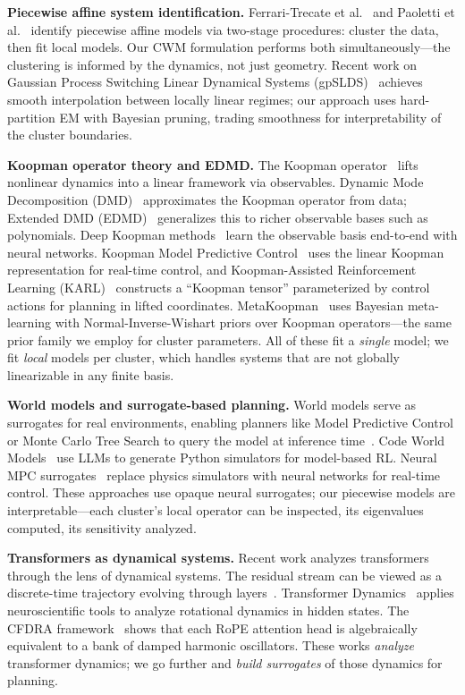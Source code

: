 \documentclass[11pt]{article}
\theoremstyle{definition}
\begin{document}
\textbf{Piecewise affine system identification.} Ferrari-Trecate et al.~\cite{ferrari2003clustering} and Paoletti et al.~\cite{paoletti2007identification} identify piecewise affine models via two-stage procedures: cluster the data, then fit local models. Our CWM formulation performs both simultaneously---the clustering is informed by the dynamics, not just geometry. Recent work on Gaussian Process Switching Linear Dynamical Systems (gpSLDS)~\cite{gpslds2024} achieves smooth interpolation between locally linear regimes; our approach uses hard-partition EM with Bayesian pruning, trading smoothness for interpretability of the cluster boundaries.

\textbf{Koopman operator theory and EDMD.} The Koopman operator~\cite{brunton2022modern} lifts nonlinear dynamics into a linear framework via observables. Dynamic Mode Decomposition (DMD)~\cite{schmid2010dmd,tu2014dmd} approximates the Koopman operator from data; Extended DMD (EDMD)~\cite{williams2015data} generalizes this to richer observable bases such as polynomials. Deep Koopman methods~\cite{lusch2018deep} learn the observable basis end-to-end with neural networks. Koopman Model Predictive Control~\cite{korda2018koopman} uses the linear Koopman representation for real-time control, and Koopman-Assisted Reinforcement Learning (KARL)~\cite{karl2024} constructs a ``Koopman tensor'' parameterized by control actions for planning in lifted coordinates. MetaKoopman~\cite{metakoopman2025} uses Bayesian meta-learning with Normal-Inverse-Wishart priors over Koopman operators---the same prior family we employ for cluster parameters. All of these fit a \emph{single} model; we fit \emph{local} models per cluster, which handles systems that are not globally linearizable in any finite basis.

\textbf{World models and surrogate-based planning.} World models serve as surrogates for real environments, enabling planners like Model Predictive Control or Monte Carlo Tree Search to query the model at inference time~\cite{worldmodelsurvey2025}. Code World Models~\cite{codeworldmodels2024} use LLMs to generate Python simulators for model-based RL. Neural MPC surrogates~\cite{neuralmpc2024} replace physics simulators with neural networks for real-time control. These approaches use opaque neural surrogates; our piecewise models are interpretable---each cluster's local operator can be inspected, its eigenvalues computed, its sensitivity analyzed.

\textbf{Transformers as dynamical systems.} Recent work analyzes transformers through the lens of dynamical systems. The residual stream can be viewed as a discrete-time trajectory evolving through layers~\cite{mechanalysis2024}. Transformer Dynamics~\cite{transformerdynamics2025} applies neuroscientific tools to analyze rotational dynamics in hidden states. The CFDRA framework~\cite{tomaz2025cfdra} shows that each RoPE attention head is algebraically equivalent to a bank of damped harmonic oscillators. These works \emph{analyze} transformer dynamics; we go further and \emph{build surrogates} of those dynamics for planning.
\end{document}
